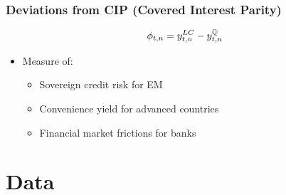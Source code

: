 \documentclass[12pt, aspectratio=169, xcolor=dvipsnames]{beamer}  %
\begin{document}
\begin{frame}[label=DevCIP]
\frametitle{Deviations from CIP (Covered Interest Parity)}
\vspace{-1cm}
\[\phi_{t,n} = y_{t,n} ^{LC} - y_{t,n}^{\mathbb{Q}}\]
\vspace{-1.2cm}
\begin{itemize}
	\item Measure of:
	\begin{itemize}
		\item Sovereign credit risk for EM \citep{DuSchreger:2016JoF} %
		\item Convenience yield for advanced countries \citep*{DuImSchreger:2018JIE} %
		\item Financial market frictions for banks \citep*{DuTepperVerdelhan:2018} %
	\end{itemize}
\end{itemize}
\end{frame}


\section{Data}
\end{document}

